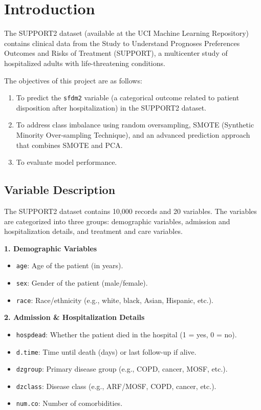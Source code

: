 \section{Introduction}

The SUPPORT2 dataset (available at the UCI Machine Learning Repository) contains clinical data from the Study to Understand Prognoses Preferences Outcomes and Risks of Treatment (SUPPORT), a multicenter study of hospitalized adults with life-threatening conditions.

The objectives of this project are as follows:
\begin{enumerate}
    \item To predict the \texttt{sfdm2} variable (a categorical outcome related to patient disposition after hospitalization) in the SUPPORT2 dataset.
    \item To address class imbalance using random oversampling, SMOTE (Synthetic Minority Over-sampling Technique), and an advanced prediction approach that combines SMOTE and PCA.
    \item To evaluate model performance.
\end{enumerate}

\subsection{Variable Description}
The SUPPORT2 dataset contains 10,000 records and 20 variables. The variables are categorized into three groups: 
demographic variables, admission and hospitalization details,
 and treatment and care variables.

\textbf{1. Demographic Variables}
\begin{itemize}
    \item \texttt{age}: Age of the patient (in years).
    \item \texttt{sex}: Gender of the patient (male/female).
    \item \texttt{race}: Race/ethnicity (e.g., white, black, Asian, Hispanic, etc.).
\end{itemize}

\textbf{2. Admission \& Hospitalization Details}
\begin{itemize}
    \item \texttt{hospdead}: Whether the patient died in the hospital (1 = yes, 0 = no).
    \item \texttt{d.time}: Time until death (days) or last follow-up if alive.
    \item \texttt{dzgroup}: Primary disease group (e.g., COPD, cancer, MOSF, etc.).
    \item \texttt{dzclass}: Disease class (e.g., ARF/MOSF, COPD, cancer, etc.).
    \item \texttt{num.co}: Number of comorbidities.
\end{itemize}


